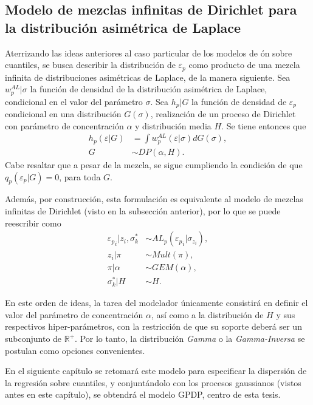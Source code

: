 \subsection{Modelo de mezclas infinitas de Dirichlet para la distribuci\'on asim\'etrica de Laplace}

Aterrizando las ideas anteriores al caso particular de los modelos de \regresi\'on sobre cuantiles, se busca describir la distribuci\'on de $\varepsilon_p$ como producto de una mezcla infinita de distribuciones asim\'etricas de Laplace, de la manera siguiente. Sea $w_p^{AL} | \sigma$ la funci\'on de densidad de la distribuci\'on asim\'etrica de Laplace, condicional en el valor del par\'ametro $\sigma$. Sea $h_p|G$ la funci\'on de densidad de $\varepsilon_p$ condicional en una distribuci\'on $G(\sigma)$, realizaci\'on de un proceso de Dirichlet con par\'ametro de concentraci\'on $\alpha$ y distribuci\'on media $H$. Se tiene entonces que
\begin{equation*}
\begin{aligned}
    h_p(\varepsilon|G) &= \int w_p^{AL}(\varepsilon|\sigma)dG(\sigma), \\
    G &\sim DP(\alpha,H).
\end{aligned}
\end{equation*}
Cabe resaltar que a pesar de la mezcla, se sigue cumpliendo la condici\'on de que $q_p(\varepsilon_p|G) = 0$, para toda $G$.

Adem\'as, por construcci\'on, esta formulaci\'on es equivalente al modelo de mezclas infinitas de Dirichlet (visto en la subsecci\'on anterior), por lo que se puede reescribir como
\begin{equation*}
\begin{aligned}
   {\varepsilon_p}_i | z_i, \sigma_k^* &\sim AL_p({\varepsilon_p}_i | \sigma_{z_i}), \\
   z_i | \pi &\sim Mult(\pi), \\
   \pi | \alpha &\sim GEM(\alpha), \\
   \sigma_k^* | H &\sim H.
\end{aligned}
\end{equation*}

En este orden de ideas, la tarea del modelador \'unicamente consistir\'a en definir el valor del par\'ametro de concentraci\'on $\alpha$, as\'i como a la distribuci\'on de $H$ y sus respectivos hiper-par\'ametros, con la restricci\'on de que su soporte deber\'a ser un subconjunto de $\mathbb{R}^+$. Por lo tanto, la distribuci\'on \textit{Gamma} o la \textit{Gamma-Inversa} se postulan como opciones convenientes.

En el siguiente cap\'itulo se retomar\'a este modelo para especificar la dispersi\'on de la regresi\'on sobre cuantiles, y conjunt\'andolo con los procesos gaussianos (vistos antes en este cap\'itulo), se obtendr\'a el modelo GPDP, centro de esta tesis.

\newpage
